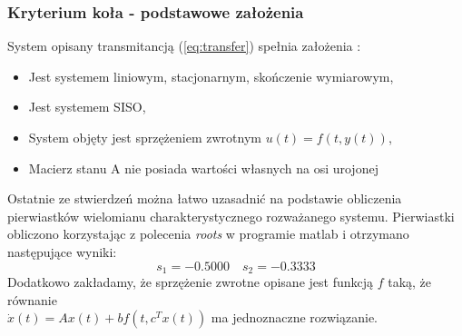 \documentclass[a4paper,11pt]{article}
\begin{document}
\subsubsection{Kryterium koła - podstawowe założenia}
System opisany transmitancją (\ref{eq:transfer}) spełnia założenia :
\begin{itemize}
\item Jest systemem liniowym, stacjonarnym, skończenie wymiarowym,
\item Jest systemem SISO,
\item System objęty jest sprzężeniem zwrotnym \( u(t)=f(t,y(t)) \), 
\item Macierz stanu A nie posiada wartości własnych na osi urojonej
\end{itemize}
Ostatnie ze stwierdzeń można łatwo uzasadnić na podstawie obliczenia pierwiastków wielomianu charakterystycznego rozważanego systemu. Pierwiastki obliczono korzystając z polecenia \textit{roots} w programie matlab i otrzymano następujące wyniki:
\begin{equation*}
s_{1} = -0.5000
\quad s_{2} = -0.3333
\end{equation*}
Dodatkowo zakładamy, że sprzężenie zwrotne opisane jest funkcją \(f\) taką, że równanie  \\ \( \dot{x}(t)=Ax(t)+bf(t,c^{T}x(t)) \) ma jednoznaczne rozwiązanie.
\end{document}
